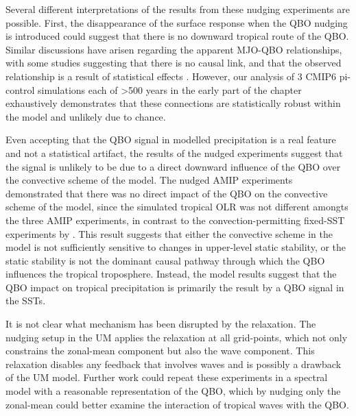 Several different interpretations of the results from these nudging experiments are possible. First, the disappearance of the surface response when the QBO nudging is introduced could suggest that there is no downward tropical route of the QBO. Similar discussions have arisen regarding the apparent MJO-QBO relationships, with some studies suggesting that there is no causal link, and that the observed relationship is a result of statistical effects \citep{wang2019}. However,  our analysis of 3 CMIP6 pi-control simulations each of >500 years  in the early part of the chapter exhaustively demonstrates that these connections are statistically robust within the model and unlikely due to chance.

Even accepting that the QBO signal in modelled precipitation is a real feature and not a statistical artifact, the results of the nudged experiments suggest that the signal is unlikely to be due to a direct downward influence of the QBO over the convective scheme of the model. The nudged AMIP experiments demonstrated that there was no direct impact of the QBO on the convective scheme of the model, since the simulated tropical OLR was not different amongts the three AMIP experiments, in contrast to the convection-permitting fixed-SST experiments by \cite{nie2015}. This result suggests that either the convective scheme in the model is not sufficiently sensitive to changes in upper-level static stability, or the static stability is not the dominant causal pathway through which the QBO influences the tropical troposphere. Instead, the model  results suggest that the QBO impact  on tropical precipitation is primarily the result by a QBO signal in the SSTs.  

It is not clear what mechanism has been disrupted by the relaxation. The nudging setup in the UM applies the relaxation at all grid-points, which not only constrains the zonal-mean component but also the wave component. This relaxation disables any feedback that involves waves and is possibly a drawback of the UM model.
Further work could repeat these experiments in a spectral model with a reasonable representation of the QBO, which by nudging only the zonal-mean could better examine the interaction of tropical waves with the QBO. 



